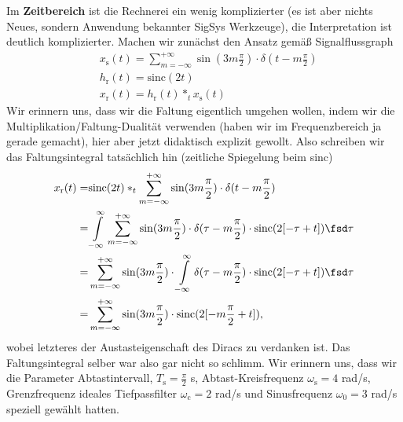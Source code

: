\begin{Loesung}
Im \textbf{Zeitbereich} ist die Rechnerei ein wenig komplizierter (es ist aber
nichts Neues, sondern Anwendung bekannter SigSys Werkzeuge), die Interpretation
ist deutlich komplizierter.
Machen wir zunächst den Ansatz gemäß Signalflussgraph
\begin{align}
&x_\mathrm{s}(t) =
\sum_{m=-\infty}^{+\infty} \sin(3 m \frac{\pi}{2}) \cdot \delta(t-m \frac{\pi}{2})\\
&h_\mathrm{r}(t) = \mathrm{sinc}(2 t)\\
&x_\mathrm{r}(t) = h_\mathrm{r}(t) \ast_t x_\mathrm{s}(t)
\end{align}
Wir erinnern uns, dass wir die Faltung eigentlich umgehen wollen, indem
wir die Multiplikation/Faltung-Dualität verwenden (haben wir im Frequenzbereich
ja gerade gemacht), hier aber jetzt didaktisch explizit gewollt.
Also schreiben wir das Faltungsintegral tatsächlich hin (zeitliche Spiegelung beim sinc)
\begin{align}
x_\mathrm{r}(t) =&
\mathrm{sinc}(2 t)
\ast_t
\sum_{m=-\infty}^{+\infty} \sin(3 m \frac{\pi}{2}) \cdot \delta(t-m \frac{\pi}{2})\\
=&
\int\limits_{-\infty}^{\infty}
\sum_{m=-\infty}^{+\infty} \sin(3 m \frac{\pi}{2}) \cdot \delta(\tau-m \frac{\pi}{2})
\cdot \mathrm{sinc}(2 [-\tau + t]) \fsd \tau\\
=&
\sum_{m=-\infty}^{+\infty} \sin(3 m \frac{\pi}{2}) \cdot
\int\limits_{-\infty}^{\infty} \delta(\tau-m \frac{\pi}{2})
\cdot \mathrm{sinc}(2 [-\tau + t]) \fsd \tau\\
=&
\sum_{m=-\infty}^{+\infty} \sin(3 m \frac{\pi}{2}) \cdot \mathrm{sinc}(2 [-m \frac{\pi}{2} + t]),
\label{eq:EF235EE3D8_SincSpecialResult}
\end{align}
wobei letzteres der Austasteigenschaft des Diracs zu verdanken ist.
Das Faltungsintegral selber war also gar nicht so schlimm.
%
Wir erinnern uns, dass wir die Parameter Abtastintervall, $T_\mathrm{s}=\frac{\pi}{2}$ s,
Abtast-Kreisfrequenz $\omega_\mathrm{s}=4$  rad/s, Grenzfrequenz ideales
Tiefpassfilter $\omega_\mathrm{c} = 2$ rad/s und Sinusfrequenz $\omega_0=3$ rad/s
speziell gewählt hatten.
\end{Loesung}
%
%

